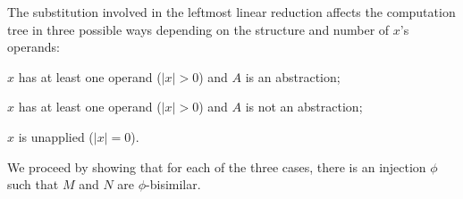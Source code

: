 \documentclass{elsarticle}
\theoremstyle{plain}
\theoremstyle{definition}
\theoremstyle{remark}
\newcommand{\enables}{\vdash} %
\begin{document}
The substitution involved in the leftmost linear reduction affects the computation tree in three possible ways depending on the structure and number of $x$'s operands:
\begin{description}[itemindent=1em]
    \item[Case 1] $x$ has at least one operand ($|x|>0$) and $A$ is an abstraction;
    \item[Case 2] $x$ has at least one operand ($|x|>0$) and $A$ is not an abstraction;
    \item[Case 3] $x$ is unapplied ($|x|=0$).
\end{description}

%

We proceed by showing that for each of the three cases, there is an injection $\phi$ such that $M$ and $N$ are $\phi$-bisimilar.
\end{document}

